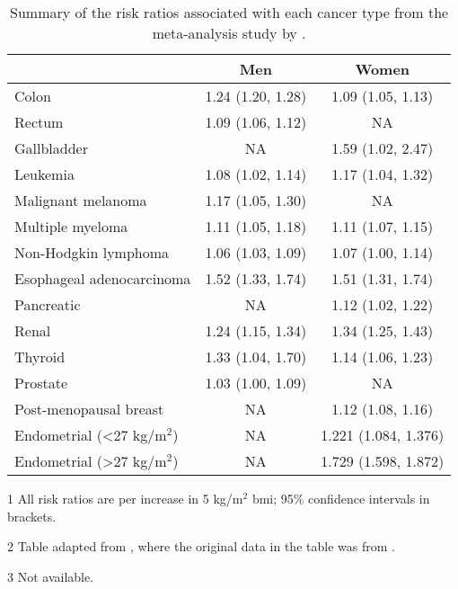 \begin{table}[htb]
	\centering
	\begin{threeparttable}
		\caption[Summary of the risk ratios associated with each cancer type from the meta-analysis study by \citet{Renehan2008}]{Summary of the risk ratios associated with each cancer type from the meta-analysis study by \citet{Renehan2008}.}
		\label{tab:renehan_cancer_risks}
		\begin{tabular}{lcc}
													   & Men               & Women\\
			\hline
			\rule{0pt}{2.25ex}Colon                 & 1.24 (1.20, 1.28) & 1.09 (1.05, 1.13)\\
			Rectum                                  & 1.09 (1.06, 1.12) & NA\tnote{3}\\
			Gallbladder                             & NA                & 1.59 (1.02, 2.47)\\
			Leukemia                                & 1.08 (1.02, 1.14) & 1.17 (1.04, 1.32)\\
			Malignant melanoma                      & 1.17 (1.05, 1.30) & NA\\
			Multiple myeloma                        & 1.11 (1.05, 1.18) & 1.11 (1.07, 1.15)\\
			Non-Hodgkin lymphoma                    & 1.06 (1.03, 1.09) & 1.07 (1.00, 1.14)\\
			Esophageal adenocarcinoma               & 1.52 (1.33, 1.74) & 1.51 (1.31, 1.74)\\
			Pancreatic                              & NA                & 1.12 (1.02, 1.22)\\
			Renal                                   & 1.24 (1.15, 1.34) & 1.34 (1.25, 1.43)\\
			Thyroid                                 & 1.33 (1.04, 1.70) & 1.14 (1.06, 1.23)\\
			Prostate                                & 1.03 (1.00, 1.09) & NA\\
			Post-menopausal breast                  & NA                & 1.12 (1.08, 1.16)\\
			Endometrial (\textless{}27 kg/m$^2$)    & NA                & 1.221 (1.084, 1.376)\\
			Endometrial (\textgreater{}27 kg/m$^2$) & NA                & 1.729 (1.598, 1.872)\\
			\hline
			\hline
		\end{tabular}
		\begin{tablenotes}
			\begin{footnotesize}
				\item [1] All risk ratios are per increase in 5 kg/m$^2$ \gls{bmi}; 95\% confidence intervals in brackets.
				\item [2] Table adapted from \citet{Roberts2010}, where the original data in the table was from \citet{Renehan2008}.
				\item [3] Not available.
			\end{footnotesize}
		\end{tablenotes}
	\end{threeparttable}
\end{table}

